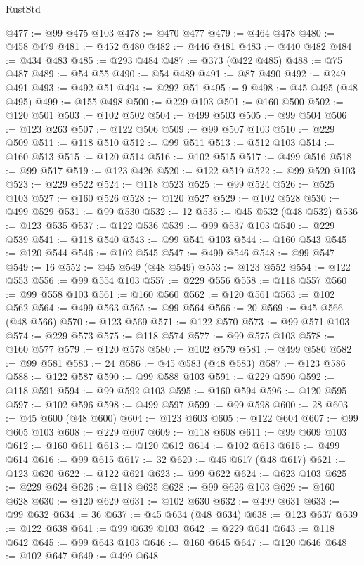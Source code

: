 \begin{lexlean}{RustStd}
\begin{coremodule}
{\begin{coremodule}
{{{{{{{{{{{{{{{{{{{{{{{{{{{{{{{{{@477 := @99 @475 @103
@478 := @470 @477
@479 := @464 @478
@480 := @458 @479
@481 := @452 @480
@482 := @446 @481
@483 := @440 @482
@484 := @434 @483
@485 := @293 @484
@487 := @373 (@422 @485)
@488 := @75 @487
@489 := @54 @55
@490 := @54 @489
@491 := @87 @490
@492 := @249 @491
@493 := @492 @51
@494 := @292 @51
@495 := 9
@498 := @45 @495 (@48 @495)
@499 := @155 @498
@500 := @229 @103
@501 := @160 @500
@502 := @120 @501
@503 := @102 @502
@504 := @499 @503
@505 := @99 @504
@506 := @123 @263
@507 := @122 @506
@509 := @99 @507 @103
@510 := @229 @509
@511 := @118 @510
@512 := @99 @511
@513 := @512 @103
@514 := @160 @513
@515 := @120 @514
@516 := @102 @515
@517 := @499 @516
@518 := @99 @517
@519 := @123 @426
@520 := @122 @519
@522 := @99 @520 @103
@523 := @229 @522
@524 := @118 @523
@525 := @99 @524
@526 := @525 @103
@527 := @160 @526
@528 := @120 @527
@529 := @102 @528
@530 := @499 @529
@531 := @99 @530
@532 := 12
@535 := @45 @532 (@48 @532)
@536 := @123 @535
@537 := @122 @536
@539 := @99 @537 @103
@540 := @229 @539
@541 := @118 @540
@543 := @99 @541 @103
@544 := @160 @543
@545 := @120 @544
@546 := @102 @545
@547 := @499 @546
@548 := @99 @547
@549 := 16
@552 := @45 @549 (@48 @549)
@553 := @123 @552
@554 := @122 @553
@556 := @99 @554 @103
@557 := @229 @556
@558 := @118 @557
@560 := @99 @558 @103
@561 := @160 @560
@562 := @120 @561
@563 := @102 @562
@564 := @499 @563
@565 := @99 @564
@566 := 20
@569 := @45 @566 (@48 @566)
@570 := @123 @569
@571 := @122 @570
@573 := @99 @571 @103
@574 := @229 @573
@575 := @118 @574
@577 := @99 @575 @103
@578 := @160 @577
@579 := @120 @578
@580 := @102 @579
@581 := @499 @580
@582 := @99 @581
@583 := 24
@586 := @45 @583 (@48 @583)
@587 := @123 @586
@588 := @122 @587
@590 := @99 @588 @103
@591 := @229 @590
@592 := @118 @591
@594 := @99 @592 @103
@595 := @160 @594
@596 := @120 @595
@597 := @102 @596
@598 := @499 @597
@599 := @99 @598
@600 := 28
@603 := @45 @600 (@48 @600)
@604 := @123 @603
@605 := @122 @604
@607 := @99 @605 @103
@608 := @229 @607
@609 := @118 @608
@611 := @99 @609 @103
@612 := @160 @611
@613 := @120 @612
@614 := @102 @613
@615 := @499 @614
@616 := @99 @615
@617 := 32
@620 := @45 @617 (@48 @617)
@621 := @123 @620
@622 := @122 @621
@623 := @99 @622
@624 := @623 @103
@625 := @229 @624
@626 := @118 @625
@628 := @99 @626 @103
@629 := @160 @628
@630 := @120 @629
@631 := @102 @630
@632 := @499 @631
@633 := @99 @632
@634 := 36
@637 := @45 @634 (@48 @634)
@638 := @123 @637
@639 := @122 @638
@641 := @99 @639 @103
@642 := @229 @641
@643 := @118 @642
@645 := @99 @643 @103
@646 := @160 @645
@647 := @120 @646
@648 := @102 @647
@649 := @499 @648
}}}}}}}}}}}}}}}}}}}}}}}}}}}}}}}}}
\end{coremodule}}
\end{coremodule}
\end{lexlean}

